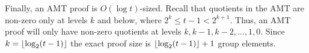 
Finally, an AMT proof is $O(\log{t})$-sized.
Recall that quotients in the AMT are non-zero only at levels $k$ and below, where $2^k \le t-1 < 2^{k+1}$.
Thus, an AMT proof will only have non-zero quotients at levels $k, k-1, k-2, \dots, 1, 0$.
Since $k = \lfloor\log_2(t-1)\rfloor$ the exact proof size is $\lfloor\log_2(t-1)\rfloor+1$ group elements.

